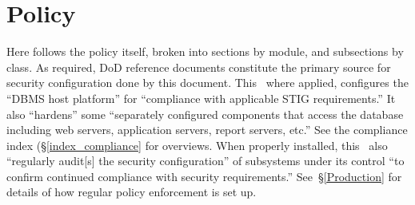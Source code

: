 \chapter{Policy}
\label{Policy}
Here follows the policy itself, broken into sections by module, and
subsections by class.
%
As required, DoD reference documents constitute the primary source for
security configuration done by this document.
%
This \CMITSPolicy\, where applied, configures the ``DBMS host platform''
for ``compliance with applicable STIG requirements.'' It also
``hardens'' some ``separately configured components that access the
database including web servers, application servers, report servers,
etc.'' See the compliance index (\S\ref{index_compliance} for overviews.
When properly installed, this \CMITSPolicy\ also ``regularly audit[s] the
security configuration'' of subsystems under its control ``to confirm
continued compliance with security requirements.'' See~\S\ref{Production}
for details of how regular policy enforcement is set up.


